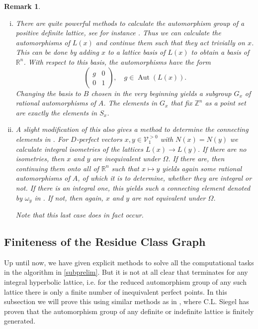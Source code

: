 \documentclass[10pt, preprint]{elsarticle}
\newtheorem{remark}[theorem]{Remark}
\theoremstyle{definition}
\theoremstyle{definition}
\newcommand{\Z}{\mathbb{Z}}
\newcommand{\R}{\mathbb{R}}
\newcommand{\V}{\mathcal{V}}
\newcommand{\Aut}{\operatorname{Aut}}
\newcommand{\Vgt}{\V_1^{>0}}
\begin{document}
\begin{remark}\label{remStab}\mbox{}
\begin{enumerate}[(i)]
\item There are quite powerful methods to calculate the automorphism group of a positive definite lattice, see for instance \cite{PlS}. Thus we can calculate the automorphisms of $L(x)$ and continue them such that they act trivially on $x$. This can be done by adding $x$ to a lattice basis of $L(x)$ to obtain a basis of $\R^n$. With respect to this basis, the automorphisms have the form
\[\left(\begin{array}{c|c} g & 0 \\ \hline 0 & 1\end{array}\right),\quad g\in \Aut(L(x)).\]
Changing the basis to $B$ chosen in the very beginning yields a subgroup $G_x$ of rational automorphisms of $A$. The elements in $G_x$ that fix $\Z^n$ as a point set are exactly the elements in $S_x$.
\item A slight modification of this also gives a method to determine the connecting elements in . For $D$-perfect vectors $x,y\in\Vgt$ with $N(x)=N(y)$ we calculate integral isometries of the lattices $L(x)\rightarrow L(y)$. If there are no isometries, then $x$ and $y$ are inequivalent under $\Omega$. If there are, then continuing them onto all of $\R^n$ such that $x\mapsto y$ yields again some rational automorphisms of $A$, of which it is to determine, whether they are integral or not. If there is an integral one, this yields such a connecting element denoted by $\omega_y$ in . If not, then again, $x$ and $y$ are not equivalent under $\Omega$.

Note that this last case does in fact occur.
\end{enumerate}
\end{remark}
\subsection{Finiteness of the Residue Class Graph}
Up until now, we have given explicit methods to solve all the computational tasks in the algorithm in \cref{subprelim}. But it is not at all clear that  terminates for any integral hyperbolic lattice, i.e. for the reduced automorphism group of any such lattice there is only a finite number of inequivalent perfect points. In this subsection we will prove this using similar methods as in \cite{Siegel}, where C.L. Siegel has proven that the automorphism group of any definite or indefinite lattice is finitely generated.
\end{document}

